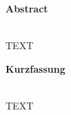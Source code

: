 	\begin{Huge}
		\textbf{Abstract}\vspace{12mm}
    \cite{hare1994}
	\end{Huge}
\\
 TEXT
 \vspace{4cm}
 \\
 \begin{Huge}
 	\textbf{Kurzfassung}\vspace{12mm}
 \end{Huge}
\\
TEXT